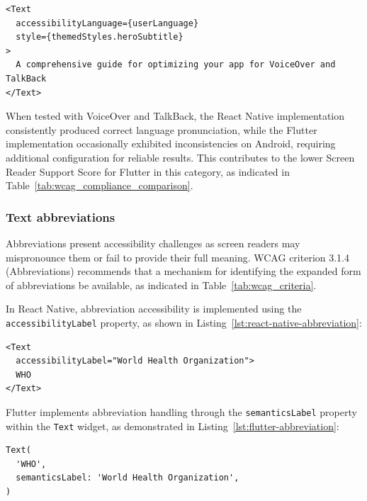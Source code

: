 \begin{lstlisting}[style=ReactNativeStyle, caption=Language handling in \textit{AccessibleHub}, label=lst:accessiblehub-language]
<Text 
  accessibilityLanguage={userLanguage} 
  style={themedStyles.heroSubtitle}
>
  A comprehensive guide for optimizing your app for VoiceOver and TalkBack
</Text>
\end{lstlisting}

\pagebreak

When tested with VoiceOver and TalkBack, the React Native implementation consistently produced correct language pronunciation, while the Flutter implementation occasionally exhibited inconsistencies on Android, requiring additional configuration for reliable results. This contributes to the lower Screen Reader Support Score for Flutter in this category, as indicated in Table~\ref{tab:wcag_compliance_comparison}.

\subsubsection{Text abbreviations}
\label{subsubsec:text-abbreviations}

Abbreviations present accessibility challenges as screen readers may mispronounce them or fail to provide their full meaning. WCAG criterion 3.1.4 (Abbreviations) recommends that a mechanism for identifying the expanded form of abbreviations be available, as indicated in Table~\ref{tab:wcag_criteria}.

In React Native, abbreviation accessibility is implemented using the \texttt{accessibilityLabel} property, as shown in Listing~\ref{lst:react-native-abbreviation}:

\begin{lstlisting}[style=ReactNativeStyle, caption=Abbreviation handling in React Native, label=lst:react-native-abbreviation]
<Text
  accessibilityLabel="World Health Organization">
  WHO
</Text>
\end{lstlisting}

Flutter implements abbreviation handling through the \texttt{semanticsLabel} property within the \texttt{Text} widget, as demonstrated in Listing~\ref{lst:flutter-abbreviation}:

\begin{lstlisting}[style=DartStyle, caption=Abbreviation handling in Flutter, label=lst:flutter-abbreviation]
Text(
  'WHO',
  semanticsLabel: 'World Health Organization',
)
\end{lstlisting}


